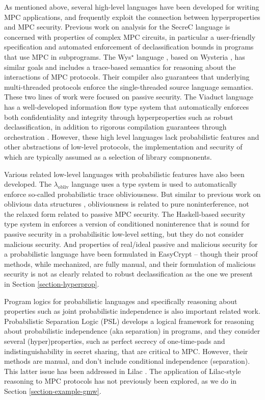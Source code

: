 As mentioned above, several high-level languages have been developed
for writing MPC applications, 
and frequently exploit the connection between hyperproperties and MPC
security. Previous work on analysis for the SecreC language
\cite{almeida2018enforcing,10.1145/2637113.2637119} is concerned with
properties of complex MPC circuits, in particular a user-friendly
specification and automated enforcement of declassification bounds in
programs that use MPC in subprograms. The Wys$^\star$ language
\cite{wysstar}, based on Wysteria \cite{rastogi2014wysteria}, has
similar goals and includes a trace-based semantics for reasoning about
the interactions of MPC protocols. Their compiler also guarantees that
underlying multi-threaded protocols enforce the single-threaded source
language semantics. These two lines of work were focused on passive
security. The Viaduct language \cite{XXX} has a well-developed
information flow type system that automatically enforces both
confidentiality and integrity through hyperproperties such as robust
declassification, in addition to rigorous compilation guarantees
through orchestration \cite{XXX}. However, these high level
languages lack probabilistic features and other abstractions of
low-level protocols, the implementation and security of which
are typically assumed as a selection of library compnonents. 

Various related low-level languages with probabilistic features have
also been developed. The $\lambda_{\mathrm{obliv}}$ language
\cite{darais2019language} uses a type system is used to automatically
enforce so-called probabilistic trace obliviousness.  But similar to
previous work on oblivious data structures \cite{10.1145/3498713},
obliviousness is related to pure noninterference, not the relaxed form
related to passive MPC security. The Haskell-based security type system in
\cite{XXX} enforces a version of conditioned noninterence that is
sound for passive security in a probabilisitic low-level setting, but
they do not consider malicious security. And properties of real/ideal
passive and malicious security for a probabilistic language have been
formulated in EasyCrypt \cite{8429300}-- though their proof methods,
while mechanized, are fully manual, and their formulation of malicious
security is not as clearly related to robust declassification as the
one we present in Section \ref{section-hyperprop}. 

Program logics for probabilistic languages and specifically reasoning
about properties such as joint probabilistic independence is also
important related work. Probabilistic Separation Logic (PSL)
\cite{barthe2019probabilistic} develops a logical framework for
reasoning about probabilistic independence (aka separation) in
programs, and they consider several (hyper)properties, such as perfect
secrecy of one-time-pads and indistinguishability in secret sharing,
that are critical to MPC. However, their methods are manual, and
don't include conditional independence (separation). This
latter issue has been addressed in Lilac \cite{XXX}. The
application of Lilac-style reasoning to MPC protocols has not
previously been explored, as we do in Section
\ref{section-example-gmw}.

